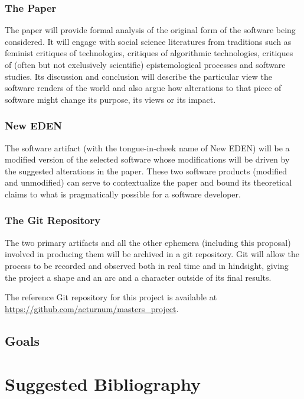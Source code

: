 \documentclass[a4paper,man,natbib]{apa6}
\begin{document}
   \subsubsection*{The Paper}
   The paper will provide formal analysis of the original form of the software being considered. It will engage with social science literatures from traditions such as feminist critiques of technologies, critiques of algorithmic technologies, critiques of (often but not exclusively scientific) epistemological processes and software studies. Its discussion and conclusion will describe the particular view the software renders of the world and also argue how alterations to that piece of software might change its purpose, its views or its impact.
   \subsubsection*{New EDEN}
   The software artifact (with the tongue-in-cheek name of New EDEN) will be a modified version of the selected software whose modifications will be driven by the suggested alterations in the paper. These two software products (modified and unmodified) can serve to contextualize the paper and bound its theoretical claims to what is pragmatically possible for a software developer.
   \subsubsection*{The Git Repository}
   The two primary artifacts and all the other ephemera (including this proposal) involved in producing them will be archived in a git repository. Git will allow the process to be recorded and observed both in real time and in hindsight, giving the project a shape and an arc and a character outside of its final results. 

   The reference Git repository for this project is available at \url{https://github.com/aeturnum/masters_project}.
   \subsection*{Goals}
   \clearpage
   \section{Suggested Bibliography}
\end{document}
